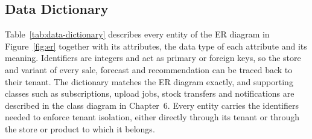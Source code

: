 \documentclass{StockSense}
\begin{document}
\subsection{Data Dictionary}

Table~\ref{tab:data-dictionary} describes every entity of the ER diagram in Figure~\ref{fig:er} together with its attributes, the data type of each attribute and its meaning. Identifiers are integers and act as primary or foreign keys, so the store and variant of every sale, forecast and recommendation can be traced back to their tenant. The dictionary matches the ER diagram exactly, and supporting classes such as subscriptions, upload jobs, stock transfers and notifications are described in the class diagram in Chapter~6. Every entity carries the identifiers needed to enforce tenant isolation, either directly through its tenant or through the store or product to which it belongs.
\end{document}

